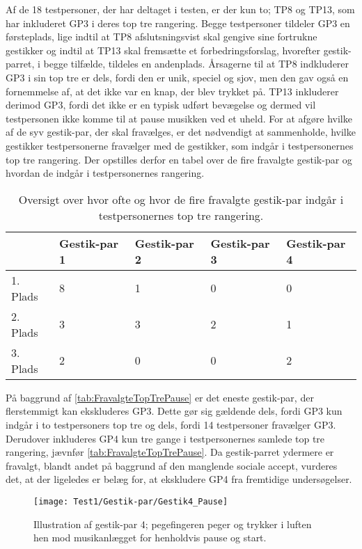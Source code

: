 Af de 18 testpersoner, der har deltaget i testen, er der kun to; TP8 og TP13, som har inkluderet GP3 i deres top tre rangering. Begge testpersoner tildeler GP3 en førsteplads, lige indtil at TP8 afslutsningsvist skal gengive sine fortrukne gestikker og indtil at TP13 skal fremsætte et forbedringsforslag, hvorefter gestik-parret, i begge tilfælde, tildeles en andenplads. Årsagerne til at TP8 indkluderer GP3 i sin top tre er dels, fordi den er unik, speciel og sjov, men den gav også en fornemmelse af, at det ikke var en knap, der blev trykket på. TP13 inkluderer derimod GP3, fordi det ikke er en typisk udført bevægelse og dermed vil testpersonen ikke komme til at pause musikken ved et uheld.\blankline
%
For at afgøre hvilke af de syv gestik-par, der skal fravælges, er det nødvendigt at sammenholde, hvilke gestikker testpersonerne fravælger med de gestikker, som indgår i testpersonernes top tre rangering. Der opstilles derfor en tabel over de fire fravalgte gestik-par og hvordan de indgår i testpersonernes rangering.
%
\begin{table}[H]
	\centering
	\begin{tabular}{ | p{2.4cm} | p{2.4cm} | p{2.4cm} | p{2.4cm} | p{2.4cm} |}
	\hline
		 & Gestik-par 1 & Gestik-par 2 & Gestik-par 3 & Gestik-par 4 \\ \hline
		1. Plads & 8 & 1 & 0 & 0\\ \hline
		2. Plads & 3 & 3 & 2 & 1\\ \hline
		3. Plads & 2 & 0 & 0 & 2\\ \hline
	\end{tabular}
	\caption{Oversigt over hvor ofte og hvor de fire fravalgte gestik-par indgår i testpersonernes top tre rangering.}
	\label{tab:FravalgteTopTrePause}
\end{table}
\noindent
%
På baggrund af \autoref{tab:FravalgteTopTrePause} er det eneste gestik-par, der flerstemmigt kan ekskluderes GP3. Dette gør sig gældende dels, fordi GP3 kun indgår i to testpersoners top tre og dels, fordi 14 testpersoner fravælger GP3. Derudover inkluderes GP4 kun tre gange i testpersonernes samlede top tre rangering, jævnfør \autoref{tab:FravalgteTopTrePause}. Da gestik-parret ydermere er fravalgt, blandt andet på baggrund af den manglende sociale accept, vurderes det, at der ligeledes er belæg for, at ekskludere GP4 fra fremtidige undersøgelser.  
%
\begin{figure}[H]
	\centering
	\texttt{[image: Test1/Gestik-par/Gestik4\_Pause]}
	\caption{Illustration af gestik-par 4; pegefingeren peger og trykker i luften hen mod musikanlægget for henholdvis pause og start.}
	\label{fig:GestikPar4Pause}
\end{figure}

